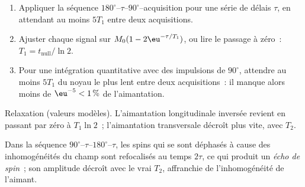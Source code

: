 \begin{method}\label{met:b3:advanced-nmr:t1}
\begin{enumerate}
  \item Appliquer la séquence $180^\circ$--$\tau$--$90^\circ$--acquisition
        pour une série de délais
        $\tau$, en attendant au moins $5T_1$ entre deux acquisitions.
  \item Ajuster chaque signal sur $M_0(1 - 2\eu^{-\tau/T_1})$, ou lire le
        passage à zéro~: $T_1 =
        t_{\mathrm{null}}/\ln2$.
  \item Pour une intégration quantitative avec des impulsions de
        $90^\circ$, attendre au moins $5T_1$ du noyau le plus lent entre
        deux acquisitions~: il manque alors moins de $\eu^{-5} < 1\,\%$
        de l'aimantation.
\end{enumerate}
\end{method}

\begin{omfigure}

{\small Relaxation (valeurs modèles). L'aimantation longitudinale inversée
revient en passant par zéro à $T_1\ln2$~; l'aimantation transversale
décroît plus vite, avec $T_2$.}
\end{omfigure}

\begin{definition}\label{def:b3:advanced-nmr:echo}
Dans la séquence $90^\circ$--$\tau$--$180^\circ$--$\tau$, les spins qui se
sont déphasés à cause des inhomogénéités du champ sont refocalisés au
temps $2\tau$, ce qui produit un
\emph{écho de spin}~; son amplitude
décroît avec le vrai $T_2$, affranchie de
l'inhomogénéité de l'aimant.
\end{definition}

